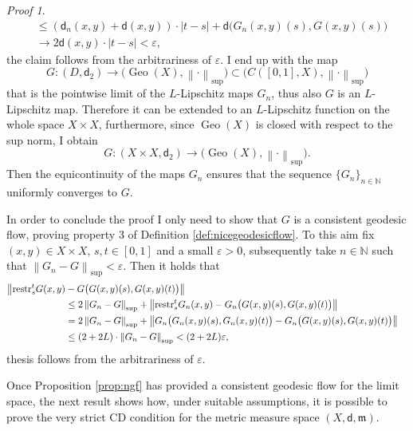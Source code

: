 \documentclass[11pt,twoside,a4paper]{article}
\newcommand{\norm}[1]{\left\lVert#1\right\rVert}
\newcommand{\setN}{\mathbb{N}}
\newcommand{\thmsymbol}{\( \square \)}
\newcommand{\rest}[2]{{{\rm restr}_{#1}^{#2}}}
\newcommand{\di}{\mathsf d} %
\newcommand{\m}{\mathfrak m} %
\DeclareMathOperator{\Geo}{Geo}
\theoremstyle{theorem}
\theoremstyle{definition}
\theoremstyle{remark}
\theoremstyle{proof}
\newtheorem*{pro}{Proof}
\newenvironment{pr}{\begin{pro}%
 \renewcommand{\qedsymbol}{\thmsymbol}\pushQED{\qed}}%
 {\popQED\end{pro}}
\begin{document}
\begin{pr}
\begin{align*}
   &\leq (\di_n (x,y)+\di(x,y)) \cdot |t-s| + \di \big( G_n(x,y)(s),G(x,y)(s) \big)\\
   & \to 2 \di(x,y) \cdot |t-s| < \varepsilon,
\end{align*}
the claim follows from the arbitrariness of $\varepsilon$. I end up with the map
\begin{equation*}
    G: (D, \di_2) \to \big( \Geo (X), \norm{\cdot}_\text{sup} \big) \subset \big(C([0,1],X), \norm{\cdot}_\text{sup} \big)
\end{equation*}
that is the pointwise limit of the $L$-Lipschitz maps $G_n$, thus also $G$ is an $L$-Lipschitz map. Therefore it can be extended to an $L$-Lipschitz function on the whole space $X \times X$, furthermore, since $\Geo(X)$ is closed with respect to the sup norm, I obtain
\begin{equation*}
    G: (X \times X, \di_2) \to \big( \Geo (X), \norm{\cdot}_\text{sup} \big).
\end{equation*}
Then the equicontinuity of the maps $G_n$ ensures that the sequence $\{G_n\}_{n\in \setN}$ uniformly converges to $G$. 

In order to conclude the proof I only need to show that $G$ is a consistent geodesic flow, proving property 3 of Definition \ref{def:nicegeodesicflow}. To this aim fix $(x,y)\in X\times X$, $s,t\in[0,1]$ and a small $\varepsilon>0$, subsequently take $n\in \setN$ such that $\norm{G_n-G}_\text{sup}<\varepsilon$. Then it holds that
\begin{align*}
    \big\lVert \rest{s}{t} G(x,y) &- G\big(G(x,y)(s),G(x,y)(t)\big) \big\rVert & \\
    &\leq 2 \norm{G_n-G}_\text{sup} + \norm{\rest{s}{t} G_n(x,y) - G_n\big(G(x,y)(s),G(x,y)(t)\big)} \\
    &=  2 \norm{G_n-G}_\text{sup} + \norm{G_n\big(G_n(x,y)(s),G_n(x,y)(t)\big) - G_n\big(G(x,y)(s),G(x,y)(t)\big)}\\
    &\leq (2+2L) \cdot \norm{G_n-G}_\text{sup}< (2+2L)\varepsilon,
\end{align*}
thesis follows from the arbitrariness of $\varepsilon$.
\end{pr}

\noindent Once Proposition \ref{prop:ngf} has provided a consistent geodesic flow for the limit space, the next result shows how, under suitable assumptions, it is possible to prove the very strict CD condition for the metric measure space $(X,\di,\m)$.
\end{document}
